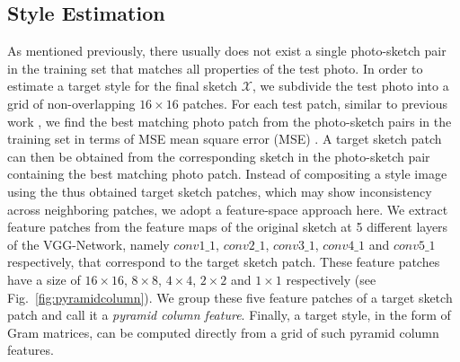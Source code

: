 \documentclass[10pt,twocolumn,letterpaper]{article}
\def\blue[#1]{{#1}}
\newcommand\ken[1]{{\small \textcolor{red}{\emph{}}}}
\begin{document}
\subsection{Style Estimation} \label{subsec:pyramid_feature_column}
As mentioned previously, there usually does not exist a single photo-sketch pair in the training set that matches all properties of the test photo. In order to estimate a target style for the final sketch $\mathcal{X}$, we subdivide the test photo into a grid of non-overlapping $16\times16$ patches. For each test patch, similar to previous work  \cite{wang2009face,zhou2012markov}, we find the best matching photo patch from the photo-sketch pairs in the training set in terms of MSE \blue[mean square error (MSE)] \ken{defines MSE}. A target sketch patch can then be obtained from the corresponding sketch in the photo-sketch pair containing the best matching photo patch. Instead of compositing a style image using the thus obtained target sketch patches, which may show inconsistency across neighboring patches, we adopt a feature-space approach here. We extract feature patches from the feature maps of the original sketch at 5 different layers of the VGG-Network, namely $conv1\_1$, $conv2\_1$, $conv3\_1$, $conv4\_1$ and $conv5\_1$ respectively, that correspond to the target sketch patch. These feature patches have a size of $16\times16$, $8\times8$, $4\times4$, $2\times2$ and $1\times1$ respectively (see Fig.~\ref{fig:pyramidcolumn}). We group these five feature patches of a target sketch patch and call it a  {\em pyramid column feature}. Finally, a target style, in the form of Gram matrices, can be computed directly from a grid of such pyramid column features.

\end{document}
